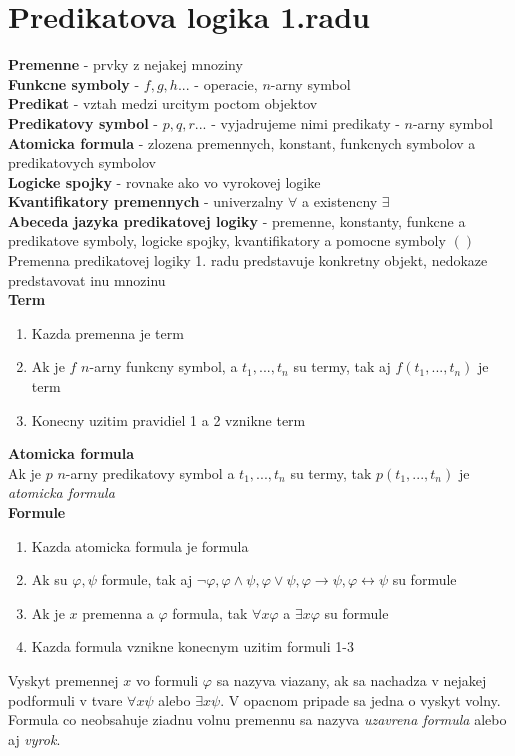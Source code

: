 \documentclass[12pt]{article}
\begin{document}
\section{Predikatova logika 1.radu}
\textbf{Premenne} - prvky z nejakej mnoziny \\
\textbf{Funkcne symboly} - $f,g,h...$ - operacie, $n$-arny symbol \\
\textbf{Predikat} - vztah medzi urcitym poctom objektov \\
\textbf{Predikatovy symbol} - $p,q,r...$ - vyjadrujeme nimi predikaty - $n$-arny symbol \\
\textbf{Atomicka formula} - zlozena premennych, konstant, funkcnych symbolov
	a predikatovych symbolov\\
\textbf{Logicke spojky} - rovnake ako vo vyrokovej logike\\
\textbf{Kvantifikatory premennych} - univerzalny $\forall$ a existencny $\exists$\\
\textbf{Abeceda jazyka predikatovej logiky} - premenne, konstanty, funkcne a predikatove symboly,
	logicke spojky, kvantifikatory a pomocne symboly $()$\\
Premenna predikatovej logiky 1. radu predstavuje konkretny objekt, nedokaze predstavovat
inu mnozinu \\

\textbf{Term}
\begin{enumerate}
	\item Kazda premenna je term
	\item Ak je $f$ $n$-arny funkcny symbol, a $t_{1},...,t_{n}$ su termy, tak aj
		$f(t_{1},...,t_{n})$ je term
	\item Konecny uzitim pravidiel 1 a 2 vznikne term
\end{enumerate}

\textbf{Atomicka formula}\\
Ak je $p$ $n$-arny predikatovy symbol a $t_{1},...,t_{n}$ su termy, tak $p(t_{1},...,t_{n})$
je \emph{atomicka formula} \\

\textbf{Formule} \\
\begin{enumerate}
	\item Kazda atomicka formula je formula
	\item Ak su $\varphi, \psi$ formule, tak aj $\neg \varphi, \varphi \land \psi, \varphi \lor \psi,
		\varphi \to \psi, \varphi \leftrightarrow \psi$ su formule
	\item Ak je $x$ premenna a $\varphi$ formula, tak $\forall x \varphi$ a $\exists x \varphi$
		su formule
	\item Kazda formula vznikne konecnym uzitim formuli 1-3
\end{enumerate}
Vyskyt premennej $x$ vo formuli $\varphi$ sa nazyva viazany, ak sa nachadza v nejakej podformuli
v tvare $\forall x \psi$ alebo $\exists x \psi$. V opacnom pripade sa jedna o vyskyt volny.
Formula co neobsahuje ziadnu volnu premennu sa nazyva \emph{uzavrena formula} alebo aj \emph{vyrok}.
\end{document}
